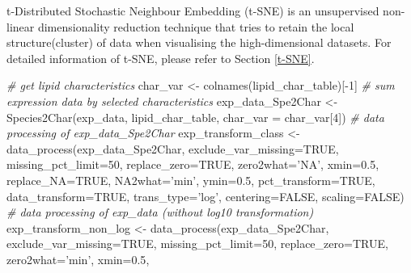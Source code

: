 \documentclass[]{article}
\newcommand{\hlnum}[1]{\textcolor[rgb]{0.816,0.125,0.439}{#1}}%
\newcommand{\hlstr}[1]{\textcolor[rgb]{0.251,0.627,0.251}{#1}}%
\newcommand{\hlcom}[1]{\textcolor[rgb]{0.502,0.502,0.502}{\textit{#1}}}%
\newcommand{\hlopt}[1]{\textcolor[rgb]{0,0,0}{#1}}%
\newcommand{\hlstd}[1]{\textcolor[rgb]{0.251,0.251,0.251}{#1}}%
\newcommand{\hlkwc}[1]{\textcolor[rgb]{0.251,0.251,0.251}{#1}}%
\newcommand{\hlkwd}[1]{\textcolor[rgb]{0.878,0.439,0.125}{#1}}%
\newenvironment{Shaded}{\begin{myshaded}}{\end{myshaded}}
\newcommand{\KeywordTok}[1]{\hlkwd{#1}}
\newcommand{\DataTypeTok}[1]{\hlkwc{#1}}
\newcommand{\DecValTok}[1]{\hlnum{#1}}
\newcommand{\FloatTok}[1]{\hlnum{#1}}
\newcommand{\StringTok}[1]{\hlstr{#1}}
\newcommand{\CommentTok}[1]{\hlcom{#1}}
\newcommand{\OtherTok}[1]{{#1}}
\newcommand{\OperatorTok}[1]{\hlopt{#1}}
\newcommand{\NormalTok}[1]{\hlstd{#1}}
\begin{document}
t-Distributed Stochastic Neighbour Embedding (t-SNE) is an unsupervised non-linear dimensionality reduction technique that tries to retain the local structure(cluster) of data when visualising the high-dimensional datasets. For detailed information of t-SNE, please refer to Section \ref{t-SNE}.

\begin{Shaded}
\begin{Highlighting}[]
\CommentTok{# get lipid characteristics}
\NormalTok{char_var <-}\StringTok{ }\KeywordTok{colnames}\NormalTok{(lipid_char_table)[}\OperatorTok{-}\DecValTok{1}\NormalTok{]}
\CommentTok{# sum expression data by selected characteristics}
\NormalTok{exp_data_Spe2Char <-}\StringTok{ }\KeywordTok{Species2Char}\NormalTok{(exp_data, lipid_char_table,}
                                  \DataTypeTok{char_var =}\NormalTok{ char_var[}\DecValTok{4}\NormalTok{])}
\CommentTok{# data processing of exp_data_Spe2Char}
\NormalTok{exp_transform_class <-}\StringTok{ }\KeywordTok{data_process}\NormalTok{(exp_data_Spe2Char, }
                                    \DataTypeTok{exclude_var_missing=}\OtherTok{TRUE}\NormalTok{,}
                                    \DataTypeTok{missing_pct_limit=}\DecValTok{50}\NormalTok{, }\DataTypeTok{replace_zero=}\OtherTok{TRUE}\NormalTok{,}
                                    \DataTypeTok{zero2what=}\StringTok{'NA'}\NormalTok{, }\DataTypeTok{xmin=}\FloatTok{0.5}\NormalTok{, }\DataTypeTok{replace_NA=}\OtherTok{TRUE}\NormalTok{,}
                                    \DataTypeTok{NA2what=}\StringTok{'min'}\NormalTok{, }\DataTypeTok{ymin=}\FloatTok{0.5}\NormalTok{, }
                                    \DataTypeTok{pct_transform=}\OtherTok{TRUE}\NormalTok{,}
                                    \DataTypeTok{data_transform=}\OtherTok{TRUE}\NormalTok{, }\DataTypeTok{trans_type=}\StringTok{'log'}\NormalTok{,}
                                    \DataTypeTok{centering=}\OtherTok{FALSE}\NormalTok{, }\DataTypeTok{scaling=}\OtherTok{FALSE}\NormalTok{)}
\CommentTok{# data processing of exp_data (without log10 transformation)}
\NormalTok{exp_transform_non_log <-}\StringTok{ }\KeywordTok{data_process}\NormalTok{(exp_data_Spe2Char,}
                                      \DataTypeTok{exclude_var_missing=}\OtherTok{TRUE}\NormalTok{,}
                                      \DataTypeTok{missing_pct_limit=}\DecValTok{50}\NormalTok{,}
                                      \DataTypeTok{replace_zero=}\OtherTok{TRUE}\NormalTok{,}
                                      \DataTypeTok{zero2what=}\StringTok{'min'}\NormalTok{, }\DataTypeTok{xmin=}\FloatTok{0.5}\NormalTok{,}

\end{Highlighting}
\end{Shaded}
\end{document}
